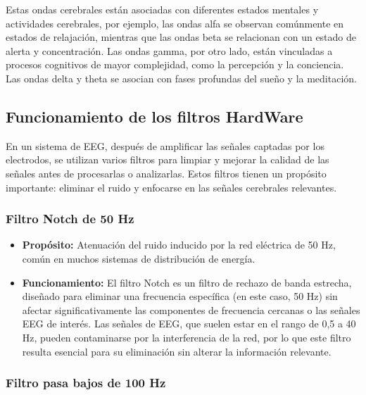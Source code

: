 \documentclass{article}
\begin{document}
Estas ondas cerebrales están asociadas con diferentes estados mentales y actividades cerebrales, por ejemplo, las ondas alfa se observan comúnmente en estados de relajación, mientras que las ondas beta se relacionan con un estado de alerta y concentración. Las ondas gamma, por otro lado, están vinculadas a procesos cognitivos de mayor complejidad, como la percepción y la conciencia. Las ondas delta y theta se asocian con fases profundas del sueño y la meditación.

\subsection{Funcionamiento de los filtros HardWare}

En un sistema de EEG, después de amplificar las señales captadas por los electrodos, se utilizan varios filtros para limpiar y mejorar la calidad de las señales antes de procesarlas o analizarlas. Estos filtros tienen un propósito importante: eliminar el ruido y enfocarse en las señales cerebrales relevantes. 

\subsubsection{Filtro Notch de 50 Hz}

\begin{itemize}

    \item \textbf{Propósito:} Atenuación del ruido inducido por la red eléctrica de 50 Hz, común en muchos sistemas de distribución de energía.
    
    \item \textbf{Funcionamiento:} El filtro Notch es un filtro de rechazo de banda estrecha, diseñado para eliminar una frecuencia específica (en este caso, 50 Hz) sin afectar significativamente las componentes de frecuencia cercanas o las señales EEG de interés. Las señales de EEG, que suelen estar en el rango de 0,5 a 40 Hz, pueden contaminarse por la interferencia de la red, por lo que este filtro resulta esencial para su eliminación sin alterar la información relevante.
    
\end{itemize}

\subsubsection{Filtro pasa bajos de 100 Hz}
\end{document}
